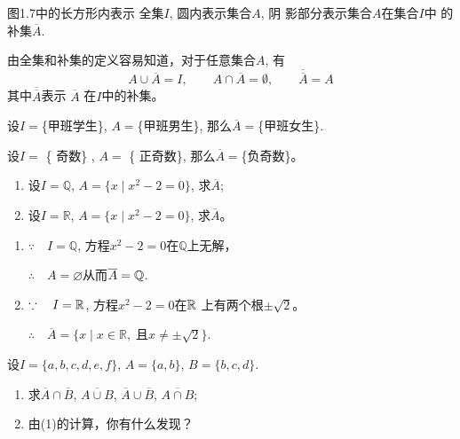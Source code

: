 图1.7中的长方形内表示
全集$I$, 圆内表示集合$A$, 阴
影部分表示集合$A$在集合$I$中
的补集$\overline{A}$.

\begin{figure}[htp]
    \centering
    \caption{}
\end{figure}

由全集和补集的定义容易知道，对于任意集合$A$, 有
\[A\cup \overline{A}=I,\qquad A\cap \overline{A}=\emptyset,\qquad \overline{\overline{A}}=A\]
其中$\overline{\overline{A}}$表示
$\overline{A}$
在$I$中的补集。

\begin{example}
    设$I=$\{甲班学生\}, $A=$\{甲班男生\}, 那么$\overline{A}=$\{甲班女生\}.
\end{example}

\begin{example}
    设$I=$ \{ 奇数\} , $A=$ \{ 正奇数\}, 那么$\overline{A}=$\{负奇数\}。
\end{example}

\begin{example}
\begin{enumerate}[(1)]
\item 设$I=\mathbb{Q}$, $A=\{x\mid x^2-2=0\}$, 求$\overline{A}$;
\item 设$I=\mathbb{R}$, $A=\{x\mid x^{2}-2=0\}$, 求$\overline{A}$。
\end{enumerate}
\end{example}

\begin{solution}
\begin{enumerate}[(1)]
\item $\because\quad I=\mathbb{Q}$, 方程$x^{2}-2=0$在$\mathbb{Q}$上无解，

$\therefore\quad A= \varnothing$从而$\overline A= \mathbb{Q}$.
\item $\because\quad I=\mathbb{R}$, 方程$x^{2}-2=0$在$\mathbb{R}$ 上有两个根$\pm\sqrt{2}$。

$\therefore\quad \overline{A}=\{x\mid x\in \mathbb{R}, \;\text{且}x\ne\pm\sqrt{2}\}$.
\end{enumerate}
\end{solution}

\begin{example}
    设$I=\{a,b,c,d,e,f\}$, $A=\{a,b\}$, $B=\{b,c,d\}$.
\begin{enumerate}[(1)]
    \item 求$\overline{A}\cap\overline{B}$, $\overline{A\cup B}$, $\overline{A}\cup\overline{B}$, $\overline{A\cap B}$;
    \item 由(1)的计算，你有什么发现？
\end{enumerate}
\end{example}

